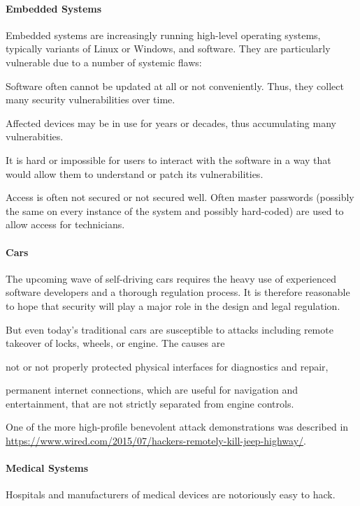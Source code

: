 \paragraph{Embedded Systems}
Embedded systems are increasingly running high-level operating systems, typically variants of Linux or Windows, and software.
They are particularly vulnerable due to a number of systemic flaws:
\begin{compactitem}
\item Software often cannot be updated at all or not conveniently. Thus, they collect many security vulnerabilities over time.
\item Affected devices may be in use for years or decades, thus accumulating many vulnerabities.
\item It is hard or impossible for users to interact with the software in a way that would allow them to understand or patch its vulnerabilities.
\item Access is often not secured or not secured well.
Often master passwords (possibly the same on every instance of the system and possibly hard-coded) are used to allow access for technicians.
\end{compactitem}

\paragraph{Cars}
The upcoming wave of self-driving cars requires the heavy use of experienced software developers and a thorough regulation process.
It is therefore reasonable to hope that security will play a major role in the design and legal regulation.

But even today's traditional cars are susceptible to attacks including remote takeover of locks, wheels, or engine.
The causes are
\begin{compactitem}
 \item not or not properly protected physical interfaces for diagnostics and repair,
 \item permanent internet connections, which are useful for navigation and entertainment, that are not strictly separated from engine controls.
\end{compactitem}
One of the more high-profile benevolent attack demonstrations was described in \url{https://www.wired.com/2015/07/hackers-remotely-kill-jeep-highway/}.

\paragraph{Medical Systems}
Hospitals and manufacturers of medical devices are notoriously easy to hack.

